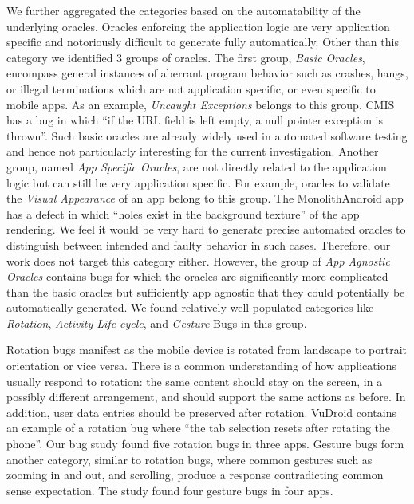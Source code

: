 We further aggregated the categories based on the automatability of the underlying oracles. Oracles enforcing the application logic are very application specific and notoriously difficult to generate fully automatically. Other than this category we identified $3$ groups of oracles.
The first group, \emph{Basic Oracles}, encompass general instances of aberrant program behavior such as crashes, hangs, or illegal terminations which are not application specific, or even specific to mobile apps. 
As an example, \emph{Uncaught Exceptions} belongs to this group. CMIS has a bug in which ``if the URL field is left empty, a null pointer exception is thrown''.
Such basic oracles are already widely used in automated software testing and hence not particularly interesting for the current investigation.
Another group, named \emph{App Specific Oracles}, are not directly related to the application logic but can still be very application specific. For example, oracles to validate the \emph{Visual Appearance} of an app belong to this group. The MonolithAndroid app has a defect in which ``holes exist in the background texture'' of the app rendering. We feel it would be very hard to generate precise automated oracles to distinguish between intended and faulty behavior in such cases. Therefore, our work does not target this category either.
However, the group of \textit{App Agnostic Oracles} contains bugs for which the oracles are significantly more complicated than the basic oracles but sufficiently app agnostic that they could potentially be automatically generated. We found relatively well populated categories like \emph{Rotation}, \emph{Activity Life-cycle}, and \emph{Gesture} Bugs in this group.

Rotation bugs manifest as the mobile device is rotated from landscape to portrait orientation or vice versa. There is a common understanding of how applications usually respond to rotation: the same content should stay on the screen, in a possibly different arrangement, and should support the same actions as before. In addition, user data entries should be preserved after rotation. VuDroid contains an example of a rotation bug where ``the tab selection resets after rotating the phone''. Our bug study found five rotation bugs in three apps. Gesture bugs form another category, similar to rotation bugs, where common gestures such as zooming in and out, and scrolling, produce a response contradicting common sense expectation. The study found four gesture bugs in four apps.

